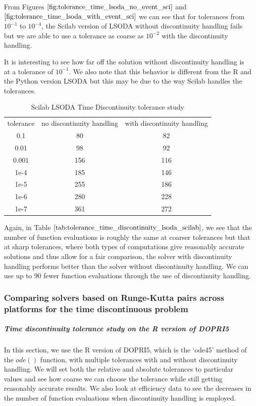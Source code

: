 From Figures $\ref{fig:tolerance_time_lsoda_no_event_sci}$ and $\ref{fig:tolerance_time_lsoda_with_event_sci}$ we can see that for tolerances from $10^{-1}$ to $10^{-4}$, the Scilab version of LSODA without discontinuity handling fails but we are able to use a tolerance as coarse as $10^{-2}$ with the discontinuity handling. 

It is interesting to see how far off the solution without discontinuity handling is at a tolerance of $10^{-1}$. We also note that this behavior is different from the R and the Python version LSODA but this may be due to the way Scilab handles the tolerances.

\begin{table}[h]
\caption {Scilab LSODA Time Discontinuity tolerance study} 
\label{tab:tolerance_time_discontinuity_lsoda_scilab} 
\begin{center}
\begin{tabular}{ c c c }
tolerance & no discontinuity handling & with discontinuity handling \\ 
0.1 & 80 & 82 \\
0.01 & 98 & 92 \\
0.001 & 156 & 116 \\
1e-4 & 185 & 146 \\
1e-5 & 255 & 186 \\
1e-6 & 280 & 228 \\
1e-7 & 361 & 272 \\
\end{tabular}
\end{center}
\end{table}
Again, in Table $\ref{tab:tolerance_time_discontinuity_lsoda_scilab}$, we see that the number of function evaluations is roughly the same at coarser tolerances but that at sharp tolerances, where both types of computations give reasonably accurate solutions and thus allow for a fair comparison, the solver with discontinuity handling performs better than the solver without discontinuity handling. We can use up to 90 fewer function evaluations through the use of discontinuity handling. 

\subsubsection{Comparing solvers based on Runge-Kutta pairs across platforms for the time discontinuous problem}
\subparagraph{Time discontinuity tolerance study on the R version of DOPRI5}

In this section, we use the R version of DOPRI5, which is the `ode45' method of the $ode()$ function, with multiple tolerances with and without discontinuity handling. We will set both the relative and absolute tolerances to particular values and see how coarse we can choose the tolerance while still getting reasonably accurate results. We also look at efficiency data to see the decreases in the number of function evaluations when discontinuity handling is employed.

